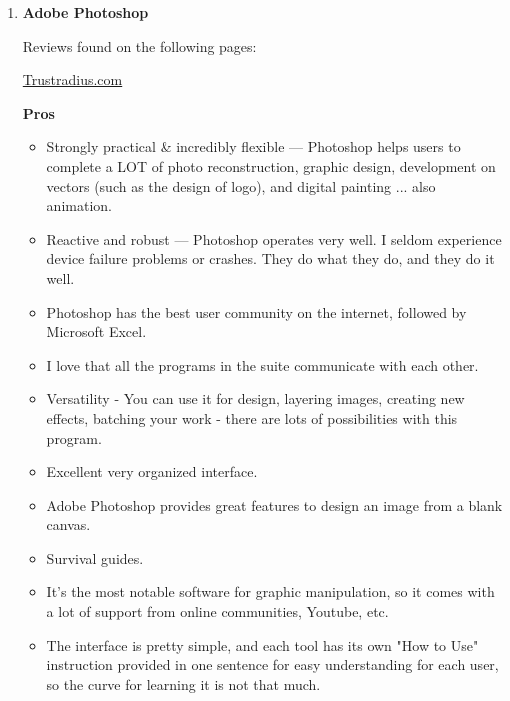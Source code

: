\documentclass[a4paper,12pt]{article}
\begin{document}
\begin{enumerate}
\item \textbf{Adobe Photoshop}

  \vspace{0.1cm}
  Reviews found on the following pages:
  \begin{center}
    \href{https://www.trustradius.com/products/adobe-photoshop/reviews}{Trustradius.com}\\
  \end{center}

  \textbf{Pros}
  \begin{itemize}
  \item Strongly practical \& incredibly flexible — Photoshop helps users to complete a LOT of photo reconstruction, graphic design, development on vectors (such as the design of logo), and digital painting ... also animation.
  \item Reactive and robust — Photoshop operates very well. I seldom experience device failure problems or crashes. They do what they do, and they do it well.
  \item Photoshop has the best user community on the internet, followed by Microsoft Excel.
  \item I love that all the programs in the suite communicate with each other.
  \item Versatility - You can use it for design, layering images, creating new effects, batching your work - there are lots of possibilities with this program.
  \item Excellent very organized interface.
  \item Adobe Photoshop provides great features to design an image from a blank canvas.
  \item Survival guides.
  \item It's the most notable software for graphic manipulation, so it comes with a lot of support from online communities, Youtube, etc.
  \item The interface is pretty simple, and each tool has its own "How to Use" instruction provided in one sentence for easy understanding for each user, so the curve for learning it is not that much.
  \end{itemize}
  

\end{enumerate}
\end{document}

